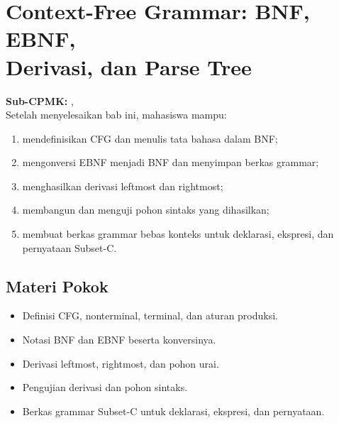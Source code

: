 \documentclass[../../main.tex]{subfiles}
\begin{document}
\chapter[Context-Free Grammar]{Context-Free Grammar: BNF, EBNF,\\ Derivasi, dan Parse Tree}
\label{chap:cfg}

\begin{outcomebox}
\textbf{Sub-CPMK:} , \\[3pt]
Setelah menyelesaikan bab ini, mahasiswa mampu:
\begin{enumerate}[label=\arabic*.,leftmargin=*]
  \item mendefinisikan CFG dan menulis tata bahasa dalam BNF;
  \item mengonversi EBNF menjadi BNF dan menyimpan berkas grammar;
  \item menghasilkan derivasi leftmost dan rightmost;
  \item membangun dan menguji pohon sintaks yang dihasilkan;
  \item membuat berkas grammar bebas konteks untuk deklarasi,
        ekspresi, dan pernyataan Subset-C.
\end{enumerate}
\end{outcomebox}

\section*{Materi Pokok}
\begin{itemize}[leftmargin=*]
  \item Definisi CFG, nonterminal, terminal, dan aturan produksi.
  \item Notasi BNF dan EBNF beserta konversinya.
  \item Derivasi leftmost, rightmost, dan pohon urai.
  \item Pengujian derivasi dan pohon sintaks.
  \item Berkas grammar Subset-C untuk deklarasi, ekspresi, dan
        pernyataan.
\end{itemize}















\ifSubfilesClassLoaded{%
}{}
\end{document}
